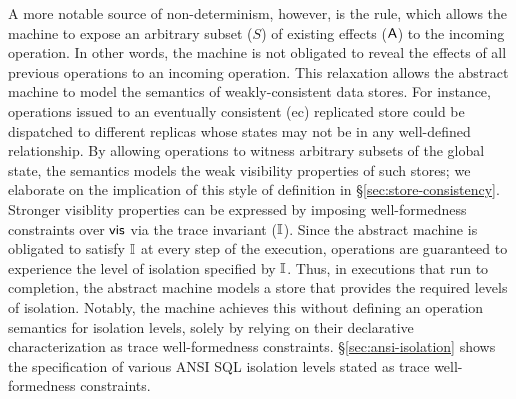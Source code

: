 A more notable source of non-determinism, however, is the
 rule, which allows the machine to expose an
arbitrary subset ($S$) of existing effects ($\textsf{A}$) to the incoming
operation. In other words, the machine is not obligated to reveal the
effects of all previous operations to an incoming operation. This
relaxation allows the abstract machine to model the semantics of
weakly-consistent data stores. For instance, operations issued to an
eventually consistent ({\sc ec}) replicated store could be dispatched
to different replicas whose states may not be in any well-defined
relationship. By allowing operations to witness arbitrary subsets of
the global state, the semantics models the weak visibility properties
of such stores; we elaborate on the implication of this style of
definition in \S\ref{sec:store-consistency}.  Stronger visiblity
properties can be expressed by imposing well-formedness constraints
over $\textsf{vis}$ via the trace invariant ($\mathbb{I}$). Since the abstract
machine is obligated to satisfy $\mathbb{I}$ at every step of the execution,
operations are guaranteed to experience the level of isolation
specified by $\mathbb{I}$.  Thus, in executions that run to completion, the
abstract machine models a store that provides the required levels of
isolation.  Notably, the machine achieves this without defining an
operation semantics for isolation levels, solely by relying on their
declarative characterization as trace well-formedness constraints.
\S\ref{sec:ansi-isolation} shows the specification of various ANSI SQL
isolation levels stated as trace well-formedness constraints.



